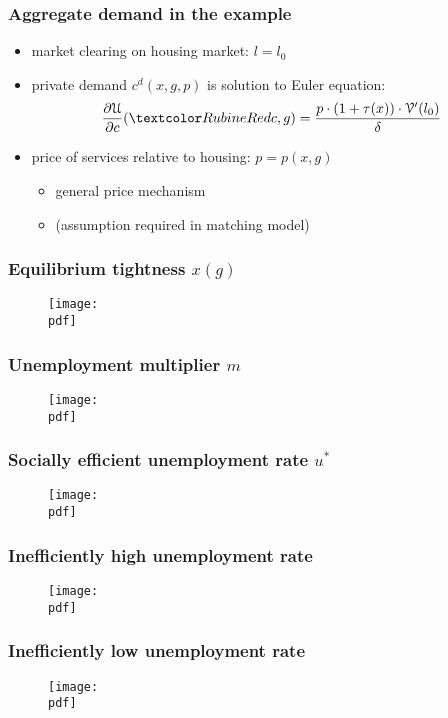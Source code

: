 \documentclass[12pt,xcolor={dvipsnames},hyperref={pdftex,pdfpagemode=UseNone,hidelinks,pdfdisplaydoctitle=true},usepdftitle=false]{beamer}
\def\pdf{xstimulus.pdf}
\begin{document}
\begin{frame}
\frametitle{Aggregate demand in the example}
\begin{itemize}
\item market clearing on housing market: $l=l_0$
\item private demand $c^{d}(x,g,p)$ is solution to Euler equation:
\begin{equation*}
\pd{\Uc}{c}(\al{c},g)=\frac{p\cdot (1+\tau(x))\cdot \Vc'(l_0)}{\d}
\end{equation*}
\item price of services relative to housing: $p=p(x,g)$
\begin{itemize}
\item general price mechanism
\item (assumption required in matching model)
\end{itemize}
\end{itemize}
\end{frame}

\begin{frame}
\frametitle{Equilibrium tightness $x(g)$}
\begin{figure}
\texttt{[image: \\pdf]}%
\end{figure}
\end{frame}

\begin{frame}
\frametitle{Unemployment multiplier $m$}
\begin{figure}
\texttt{[image: \\pdf]}%
\end{figure}
\end{frame}

\begin{frame}
\frametitle{Socially efficient unemployment rate $u^*$}
\begin{figure}
\texttt{[image: \\pdf]}%
\end{figure}
\end{frame}

\begin{frame}
\frametitle{Inefficiently high unemployment rate}
\begin{figure}
\texttt{[image: \\pdf]}%
\end{figure}
\end{frame}

\begin{frame}
\frametitle{Inefficiently low unemployment rate}
\begin{figure}
\texttt{[image: \\pdf]}%
\end{figure}
\end{frame}
\end{document}
